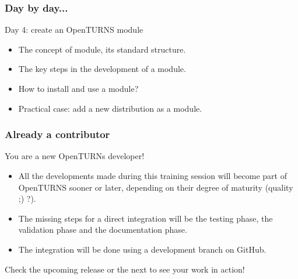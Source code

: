 \documentclass{beamer}
\begin{document}
\begin{frame}
  \frametitle{Day by day...}
  \begin{block}{Day 4: create an OpenTURNS module}
    \begin{itemize}
    \item The concept of module, its standard structure.
    \item The key steps in the development of a module.
    \item How to install and use a module?
    \item Practical case: add a new distribution as a module.
    \end{itemize}
  \end{block}
\end{frame}
\begin{frame}
  \frametitle{Already a contributor}
  \begin{block}{You are a new OpenTURNs developer!}
    \begin{itemize}
    \item All the developments made during this training session will become part of OpenTURNS sooner or later, depending on their degree of maturity (quality ;) ?).
    \item The missing steps for a direct integration will be the testing phase, the validation phase and the documentation phase.
    \item The integration will be done using a development branch on GitHub.
    \end{itemize}
    Check the upcoming release or the next to see your work in action!
  \end{block}
\end{frame}
\end{document}
